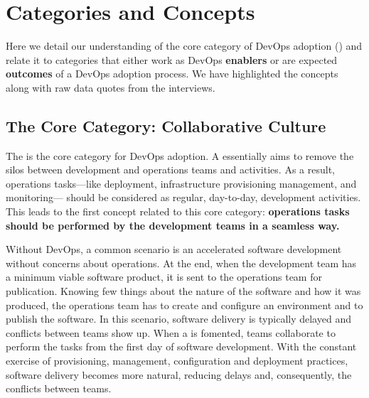 \section{Categories and Concepts} \label{sec:categories_concepts}

Here we detail our
understanding of the core category
of DevOps adoption (\cc)
and relate it to categories that either work as DevOps {\bf enablers} or
are expected {\bf outcomes} of a DevOps adoption process.
We have highlighted the concepts along with raw data quotes from the interviews.

\subsection{The Core Category: Collaborative Culture}

The \cc is the core category
for DevOps adoption. A \cc essentially aims to remove
the silos between development and operations teams and activities.
As a result, operations tasks---like deployment, infrastructure provisioning
management, and monitoring--- should be considered as regular, day-to-day,
development activities. This leads to the first concept related to
this core category: {\bf operations tasks should be performed by
the development teams in a seamless way.}


Without DevOps, a common scenario is an accelerated software development
without concerns about operations. At the end, when the development team has a
minimum viable software product, it is sent to the operations team for
publication. Knowing few things about the nature of the software and how it
was produced, the operations team has to create and configure an environment
and to publish the software. In this scenario, software delivery is typically
delayed and conflicts between teams show up. When a \cc is fomented, teams collaborate to perform the tasks from the first day
of software development. With the constant exercise of provisioning, management,
configuration and deployment practices, software delivery becomes more natural,
reducing delays and, consequently, the conflicts between teams.


